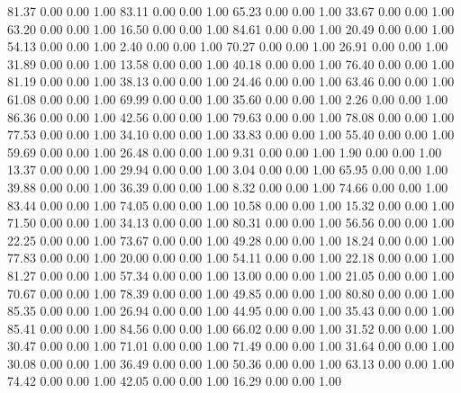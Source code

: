    81.37   0.00   0.00   1.00
   83.11   0.00   0.00   1.00
   65.23   0.00   0.00   1.00
   33.67   0.00   0.00   1.00
   63.20   0.00   0.00   1.00
   16.50   0.00   0.00   1.00
   84.61   0.00   0.00   1.00
   20.49   0.00   0.00   1.00
   54.13   0.00   0.00   1.00
    2.40   0.00   0.00   1.00
   70.27   0.00   0.00   1.00
   26.91   0.00   0.00   1.00
   31.89   0.00   0.00   1.00
   13.58   0.00   0.00   1.00
   40.18   0.00   0.00   1.00
   76.40   0.00   0.00   1.00
   81.19   0.00   0.00   1.00
   38.13   0.00   0.00   1.00
   24.46   0.00   0.00   1.00
   63.46   0.00   0.00   1.00
   61.08   0.00   0.00   1.00
   69.99   0.00   0.00   1.00
   35.60   0.00   0.00   1.00
    2.26   0.00   0.00   1.00
   86.36   0.00   0.00   1.00
   42.56   0.00   0.00   1.00
   79.63   0.00   0.00   1.00
   78.08   0.00   0.00   1.00
   77.53   0.00   0.00   1.00
   34.10   0.00   0.00   1.00
   33.83   0.00   0.00   1.00
   55.40   0.00   0.00   1.00
   59.69   0.00   0.00   1.00
   26.48   0.00   0.00   1.00
    9.31   0.00   0.00   1.00
    1.90   0.00   0.00   1.00
   13.37   0.00   0.00   1.00
   29.94   0.00   0.00   1.00
    3.04   0.00   0.00   1.00
   65.95   0.00   0.00   1.00
   39.88   0.00   0.00   1.00
   36.39   0.00   0.00   1.00
    8.32   0.00   0.00   1.00
   74.66   0.00   0.00   1.00
   83.44   0.00   0.00   1.00
   74.05   0.00   0.00   1.00
   10.58   0.00   0.00   1.00
   15.32   0.00   0.00   1.00
   71.50   0.00   0.00   1.00
   34.13   0.00   0.00   1.00
   80.31   0.00   0.00   1.00
   56.56   0.00   0.00   1.00
   22.25   0.00   0.00   1.00
   73.67   0.00   0.00   1.00
   49.28   0.00   0.00   1.00
   18.24   0.00   0.00   1.00
   77.83   0.00   0.00   1.00
   20.00   0.00   0.00   1.00
   54.11   0.00   0.00   1.00
   22.18   0.00   0.00   1.00
   81.27   0.00   0.00   1.00
   57.34   0.00   0.00   1.00
   13.00   0.00   0.00   1.00
   21.05   0.00   0.00   1.00
   70.67   0.00   0.00   1.00
   78.39   0.00   0.00   1.00
   49.85   0.00   0.00   1.00
   80.80   0.00   0.00   1.00
   85.35   0.00   0.00   1.00
   26.94   0.00   0.00   1.00
   44.95   0.00   0.00   1.00
   35.43   0.00   0.00   1.00
   85.41   0.00   0.00   1.00
   84.56   0.00   0.00   1.00
   66.02   0.00   0.00   1.00
   31.52   0.00   0.00   1.00
   30.47   0.00   0.00   1.00
   71.01   0.00   0.00   1.00
   71.49   0.00   0.00   1.00
   31.64   0.00   0.00   1.00
   30.08   0.00   0.00   1.00
   36.49   0.00   0.00   1.00
   50.36   0.00   0.00   1.00
   63.13   0.00   0.00   1.00
   74.42   0.00   0.00   1.00
   42.05   0.00   0.00   1.00
   16.29   0.00   0.00   1.00
